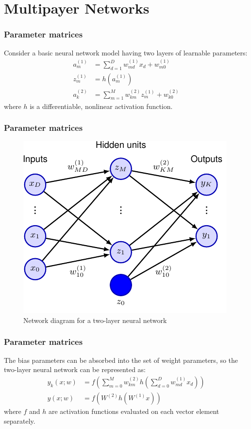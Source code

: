 \documentclass{beamer}
\begin{document}
\section{Multipayer Networks}

\begin{frame}
    \frametitle{Parameter matrices}
    Consider a basic neural network model having two layers of learnable parameters:
    \begin{align*}
        a_{m}^{(1)}&=\sum_{d=1}^{D}w_{md}^{(1)}x_{d}+w_{m0}^{(1)} \\
        z_{m}^{(1)}&=h(a_{m}^{(1)}) \\
        a_{k}^{(2)}&=\sum_{m=1}^{M}w_{km}^{(2)}z_{m}^{(1)}+w_{k0}^{(2)}
    \end{align*}
    where $h$ is a differentiable, nonlinear activation function.
\end{frame}

\begin{frame}
    \frametitle{Parameter matrices}
    \begin{figure}
        \caption{Network diagram for a two-layer neural network}
        \includegraphics{Figure_9.pdf}
    \end{figure}
\end{frame}

\begin{frame}
    \frametitle{Parameter matrices}
    The bias parameters can be absorbed into the set of weight parameters, so the two-layer neural network can be represented as:
    \begin{align*}
        y_{k}(x;w)&=f(\sum_{m=0}^{M}w_{km}^{(2)}h(\sum_{d=0}^{D}w_{md}^{(1)}x_{d})) \\
        y(x;w)&=f(W^{(2)}h(W^{(1)}x))
    \end{align*}
    where $f$ and $h$ are activation functions evaluated on each vector element separately.
\end{frame}
\end{document}
